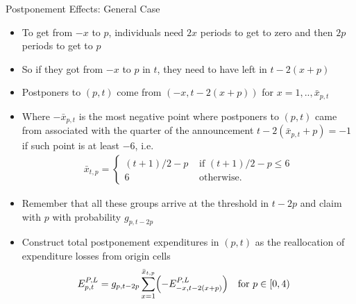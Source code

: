 \begin{frame}{Postponement Effects: General Case}
    \begin{itemize}
        \item To get from $-x$ to $p$, individuals need $2x$ periods to get to zero and then $2p$ periods to get to $p$

        \item So if they got from $-x$ to $p$ in $t$, they need to have left in $t-2(x+p)$

        \item Postponers to $(p,t)$ come from $(-x,t-2(x+p))$ for $x=1,..,\bar{x}_{p,t}$

        \item  Where $-\bar x_{p,t}$ is the most negative point where postponers to $(p,t)$ came from associated with the quarter of the announcement $t-2(\bar x_{p,t}+p)=-1$ if such point is at least $-6$, i.e.
        \begin{align*}
            \bar x_{t,p}=\begin{cases}
                (t+1)/2-p & \text{ if } (t+1)/2-p\leq 6 \\
                6 & \text{ otherwise.}
            \end{cases}
        \end{align*}
        \item {Remember that all these groups arrive at the threshold in $t-2p$ and claim with $p$ with probability $g_{p,t-2p}$}
        \item {Construct total postponement expenditures in $(p,t)$ as the reallocation of expenditure losses from origin cells}
        \begin{align*}
            E^{P,L}_{p,t}
            &=
            g_{p,t-2p}
            \sum_{x=1}^{\bar x_{t,p}}
            \Bigl(
            -E^{P,L}_{-x,t-2(x+p)}
            \Bigr) \quad \text{for } p \in [0,4)
        \end{align*}
    \end{itemize}
\end{frame}

